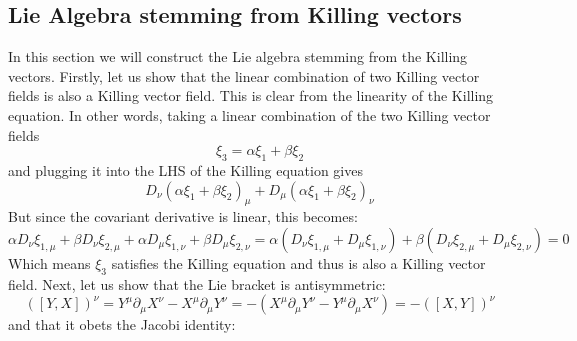 \documentclass{article}
\begin{document}
\subsection{Lie Algebra stemming from Killing vectors}
In this section we will construct the Lie algebra stemming from the Killing vectors.
\newline\newline
Firstly, let us show that the linear combination of two Killing vector fields is also a Killing vector field. This is clear from the linearity of the Killing equation. In other words, taking a linear combination of the two Killing vector fields
\begin{equation}
    \xi_3 = \alpha\xi_1 + \beta\xi_2
\end{equation}
and plugging it into the LHS of the Killing equation gives
\begin{equation}
    D_\nu\left(\alpha\xi_1 + \beta\xi_2\right)_\mu + 
    D_\mu\left(\alpha\xi_1 + \beta\xi_2\right)_\nu
\end{equation}
But since the covariant derivative is linear, this becomes:
\begin{equation}
    \alpha D_\nu\xi_{1,\mu} + \beta D_\nu\xi_{2,\mu} + 
    \alpha D_\mu\xi_{1,\nu} + \beta D_\mu\xi_{2,\nu} = 
    \alpha \left(D_\nu\xi_{1,\mu} + D_\mu\xi_{1,\nu}\right) + \beta \left(D_\nu\xi_{2,\mu} + D_\mu\xi_{2,\nu}\right) = 0
\end{equation}
Which means $\xi_3$ satisfies the Killing equation and thus is also a Killing vector field.
\newline\newline
Next, let us show that the Lie bracket is antisymmetric:
\begin{equation}
    \left(\left[Y, X\right]\right)^\nu = Y^\mu\partial_\mu X^\nu - X^\mu\partial_\mu Y^\nu = -\left(X^\mu\partial_\mu Y^\nu - Y^\mu\partial_\mu X^\nu\right) = -\left(\left[X, Y\right]\right)^\nu
\end{equation}
and that it obets the Jacobi identity:
\end{document}
